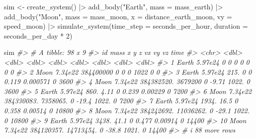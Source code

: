 \documentclass[
  10.5pt,
  letterpaper,
]{scrbook}
\newenvironment{Shaded}{\begin{snugshade}}{\end{snugshade}}
\newcommand{\AttributeTok}[1]{\textcolor[rgb]{0.00,0.00,0.00}{#1}}
\newcommand{\CommentTok}[1]{\textcolor[rgb]{0.00,0.00,0.00}{\textit{#1}}}
\newcommand{\DecValTok}[1]{\textcolor[rgb]{0.00,0.00,0.00}{#1}}
\newcommand{\FunctionTok}[1]{\textcolor[rgb]{0.00,0.00,0.00}{#1}}
\newcommand{\NormalTok}[1]{\textcolor[rgb]{0.00,0.00,0.00}{#1}}
\newcommand{\OtherTok}[1]{\textcolor[rgb]{0.00,0.00,0.00}{#1}}
\newcommand{\SpecialCharTok}[1]{\textcolor[rgb]{0.00,0.00,0.00}{#1}}
\newcommand{\StringTok}[1]{\textcolor[rgb]{0.00,0.00,0.00}{#1}}
\theoremstyle{definition}
\theoremstyle{plain}
\theoremstyle{remark}
\begin{document}
\begin{Shaded}
\begin{Highlighting}[]
\NormalTok{sim }\OtherTok{\textless{}{-}} \FunctionTok{create\_system}\NormalTok{() }\SpecialCharTok{|\textgreater{}}
  \FunctionTok{add\_body}\NormalTok{(}\StringTok{"Earth"}\NormalTok{, }\AttributeTok{mass =}\NormalTok{ mass\_earth) }\SpecialCharTok{|\textgreater{}}
  \FunctionTok{add\_body}\NormalTok{(}\StringTok{"Moon"}\NormalTok{, }\AttributeTok{mass =}\NormalTok{ mass\_moon, }\AttributeTok{x =}\NormalTok{ distance\_earth\_moon, }\AttributeTok{vy =}\NormalTok{ speed\_moon) }\SpecialCharTok{|\textgreater{}}
  \FunctionTok{simulate\_system}\NormalTok{(}\AttributeTok{time\_step =}\NormalTok{ seconds\_per\_hour, }\AttributeTok{duration =}\NormalTok{ seconds\_per\_day }\SpecialCharTok{*} \DecValTok{2}\NormalTok{)}

\NormalTok{sim}
\CommentTok{\#\textgreater{} \# A tibble: 98 x 9}
\CommentTok{\#\textgreater{}    id       mass          x           y     z      vx          vy    vz  time}
\CommentTok{\#\textgreater{}    \textless{}chr\textgreater{}   \textless{}dbl\textgreater{}      \textless{}dbl\textgreater{}       \textless{}dbl\textgreater{} \textless{}dbl\textgreater{}   \textless{}dbl\textgreater{}       \textless{}dbl\textgreater{} \textless{}dbl\textgreater{} \textless{}dbl\textgreater{}}
\CommentTok{\#\textgreater{}  1 Earth 5.97e24         0         0        0   0        0            0     0}
\CommentTok{\#\textgreater{}  2 Moon  7.34e22 384400000         0        0   0     1022            0     0}
\CommentTok{\#\textgreater{}  3 Earth 5.97e24       215.        0        0   0.119    0.000571     0  3600}
\CommentTok{\#\textgreater{}  4 Moon  7.34e22 384382520.  3679200        0  {-}9.71  1022.           0  3600}
\CommentTok{\#\textgreater{}  5 Earth 5.97e24       860.        4.11     0   0.239    0.00229      0  7200}
\CommentTok{\#\textgreater{}  6 Moon  7.34e22 384330083.  7358065.       0 {-}19.4   1022.           0  7200}
\CommentTok{\#\textgreater{}  7 Earth 5.97e24      1934.       16.5      0   0.358    0.00514      0 10800}
\CommentTok{\#\textgreater{}  8 Moon  7.34e22 384242692. 11036262.       0 {-}29.1   1022.           0 10800}
\CommentTok{\#\textgreater{}  9 Earth 5.97e24      3438.       41.1      0   0.477    0.00914      0 14400}
\CommentTok{\#\textgreater{} 10 Moon  7.34e22 384120357. 14713454.       0 {-}38.8   1021.           0 14400}
\CommentTok{\#\textgreater{} \# i 88 more rows}
\end{Highlighting}
\end{Shaded}
\end{document}

